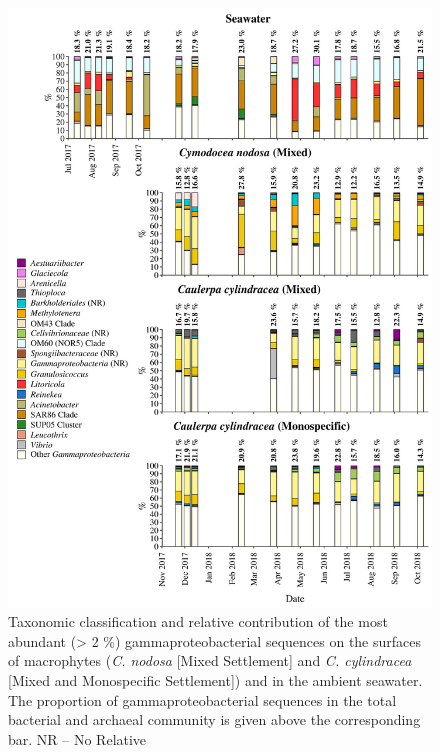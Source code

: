 \documentclass[12pt,]{article}
\begin{document}
\begin{figure}[H]

{\centering \includegraphics[width=0.85\linewidth]{../results/figures/gammaproteobacteria_bar_plot} 

}

\caption{Taxonomic classification and relative contribution of the most abundant (> 2 \si{\percent}) gammaproteobacterial sequences on the surfaces of macrophytes (\textit{C. nodosa} [Mixed Settlement] and \textit{C. cylindracea} [Mixed and Monospecific Settlement]) and in the ambient seawater. The proportion of gammaproteobacterial sequences in the total bacterial and archaeal community is given above the corresponding bar. NR -- No Relative\label{gamma}}\label{fig:unnamed-chunk-8}
\end{figure}
\end{document}
